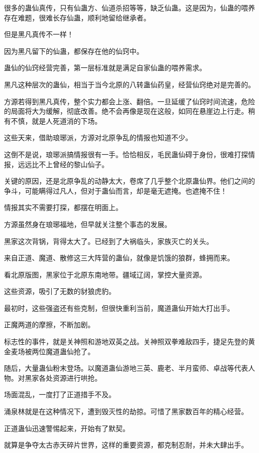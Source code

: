 \begin{this_body}
很多的蛊仙真传，只有仙蛊方、仙道杀招等等，缺乏仙蛊。这是因为，仙蛊的喂养存在难题，很难长存仙蛊，顺利地留给继承者。

但是黑凡真传不一样！

因为黑凡留下的仙蛊，都保存在他的仙窍中。

蛊仙的仙窍经营完善，第一层标准就是满足自家仙蛊的喂养需求。

黑凡这种层次的蛊仙，相当于当今北原的八转蛊仙药皇，经营仙窍绝对是完善的。

方源若得到黑凡真传，整个实力都会上涨、翻倍。一旦延缓了仙窍时间流速，危险的局面将大为缓解，彻底改善。绝不会再像是现在这般，如同在悬崖边上行走。稍有不慎，就是人死道消的下场。

这些天来，借助琅琊派，方源对北原争乱的情报也知道不少。

这倒不是说，琅琊派搞情报很有一手。恰恰相反，毛民蛊仙碍于身份，很难打探情报，远远比不上曾经的黎山仙子。

关键的原因，还是北原争乱的动静太大，卷席了几乎整个北原蛊仙界。他们之间的争斗，可能瞒得过凡人，但对于蛊仙而言，却是毫无遮掩。也遮掩不住！

情报其实不需要打探，都摆在明面上。

方源虽然身在琅琊福地，但早就关注整个事态的发展。

黑家这次背锅，背得太大了。已经到了大祸临头，家族灭亡的关头。

来自正道、魔道、散修这三大阵营的蛊仙，就像是饥饿的狼群，蜂拥而来。

看北原版图，黑家位于北原东南地带。疆域辽阔，掌控大量资源。

这些资源，吸引了无数的豺狼虎豹。

最初时，这些强盗还有些克制，但很快重利当前，魔道蛊仙开始大打出手。

正魔两道的摩擦，不断加剧。

标志性的事件，就是关神照和游地双英之战。关神照双拳难敌四手，捷足先登的黄金麦场被两位魔道蛊仙抢了。

随后，大量蛊仙粉末登场。以魔道蛊仙游地三英、鹿老、半月蛮师、卓战等代表人物。对黑家各处资源进行哄抢。

场面混乱，一度打了正道措手不及。

涌泉林就是在这种情况下，遭到毁灭性的劫掠。可惜了黑家数百年的精心经营。

正道蛊仙迅速警惕起来，开始有了默契。

就算是争夺太古赤天碎片世界，这样的重要资源，都克制忍耐，并未大肆出手。


\end{this_body}

